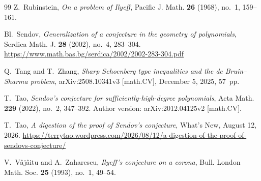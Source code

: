 \documentclass[11pt,letterpaper,reqno]{amsart}
\theoremstyle{definition}
\numberwithin{equation}{section}
\begin{document}
\begin{thebibliography}{99}
Z.~Rubinstein,
\emph{On a problem of Ilyeff},
Pacific J. Math. \textbf{26} (1968), no.~1, 159--161.

Bl.~Sendov,
\emph{Generalization of a conjecture in the geometry of polynomials},
Serdica Math. J. \textbf{28} (2002), no.~4, 283--304.
\url{https://www.math.bas.bg/serdica/2002/2002-283-304.pdf}

Q.~Tang and T.~Zhang,
\emph{Sharp Schoenberg type inequalities and the de Bruin--Sharma problem},
arXiv:2508.10341v3 [math.CV], December 5, 2025, 57~pp.

T.~Tao,
\emph{Sendov's conjecture for sufficiently-high-degree polynomials},
Acta Math. \textbf{229} (2022), no.~2, 347--392.
Author version: arXiv:2012.04125v2 [math.CV].

T.~Tao,
\emph{A digestion of the proof of Sendov's conjecture},
What's New, August 12, 2026.
\url{https://terrytao.wordpress.com/2026/08/12/a-digestion-of-the-proof-of-sendovs-conjecture/}

V.~V\^aj\^aitu and A.~Zaharescu,
\emph{Ilyeff's conjecture on a corona},
Bull. London Math. Soc. \textbf{25} (1993), no.~1, 49--54.

\end{thebibliography}
\end{document}
